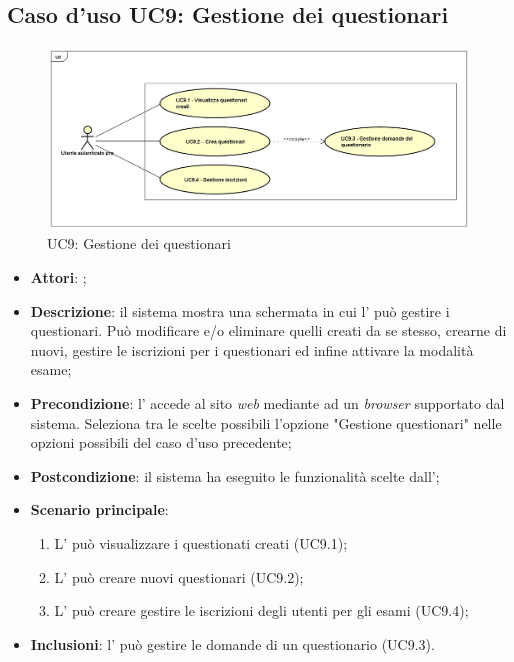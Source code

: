 \subsection{Caso d'uso UC9: Gestione dei questionari}
\label{UC9}
\begin{figure}[h]
	\centering
	\includegraphics[scale=0.5,keepaspectratio]{UML/UC9.png}
	\caption{UC9: Gestione dei questionari}
\end{figure}
\FloatBarrier
\begin{itemize}
	\item \textbf{Attori}: \uaupro{};
	\item \textbf{Descrizione}: il sistema mostra una schermata in cui l'\uaupro{} può gestire i questionari. Può modificare e/o eliminare quelli creati da se stesso, crearne di nuovi, gestire le iscrizioni per i questionari ed infine attivare la modalità esame; 
	\item \textbf{Precondizione}: l'\uaupro{} accede al sito \textit{web} mediante ad un \textit{browser} supportato dal sistema. Seleziona tra le scelte possibili l'opzione "Gestione questionari" nelle opzioni possibili del caso d'uso precedente;
	\item \textbf{Postcondizione}: il sistema ha eseguito le funzionalità scelte dall'\uaupro{};
	\item \textbf{Scenario principale}:
		\begin{enumerate}
			\item L'\uaupro{} può visualizzare i questionati creati (UC9.1);
			\item L'\uaupro{} può creare nuovi questionari (UC9.2);
			\item L'\uaupro{} può creare gestire le iscrizioni degli utenti per gli esami (UC9.4);
		\end{enumerate}
		\item \textbf{Inclusioni}: l'\uaupro{} può gestire le domande di un questionario (UC9.3).		
\end{itemize}
							
